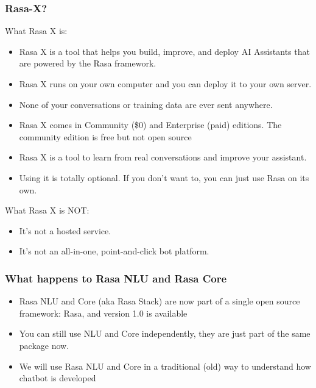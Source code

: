  \begin{frame}[fragile]\frametitle{Rasa-X?}
 What Rasa X is:
\begin{itemize}
\item Rasa X is a tool that helps you build, improve, and deploy AI Assistants that are powered by the Rasa framework. 
\item Rasa X runs on your own computer and you can deploy it to your own server. 
\item None of your conversations or training data are ever sent anywhere.
\item Rasa X comes in Community (\$0) and Enterprise (paid) editions. The community edition is free but not open source
\item Rasa X is a tool to learn from real conversations and improve your assistant.
\item Using it is totally optional. If you don’t want to, you can just use Rasa on its own.
\end{itemize}

 What Rasa X is NOT:
\begin{itemize}
\item It's not a hosted service.
\item It's not an all-in-one, point-and-click bot platform.
\end{itemize}
\end{frame}

 \begin{frame}[fragile]\frametitle{What happens to Rasa NLU and Rasa Core}
\begin{itemize}
\item Rasa NLU and Core (aka Rasa Stack) are now part of a single open source framework: Rasa, and version 1.0 is available
\item You can still use NLU and Core independently, they are just part of the same package now.
\item We will use Rasa NLU and Core in a traditional (old) way to understand how chatbot is developed
\end{itemize}
\end{frame}



